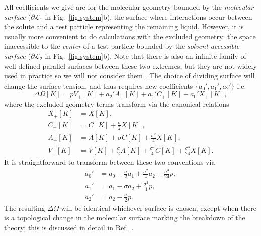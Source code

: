 \documentclass[11pt,twoside]{report}
\begin{document}
All coefficients we give are for the molecular geometry bounded by the \emph{molecular surface} ($\partial \mathcal{L}_1$ in Fig.\ \ref{fig:system}b), the surface where interactions occur between the solute and a test particle representing the remaining liquid.
However, it is usually more convenient to do calculations with the excluded geometry: the space inaccessible to the \emph{center} of a test particle bounded by the \emph{solvent accessible surface} ($\partial \mathcal{L}_2$ in Fig.\ \ref{fig:system}b).
Note that there is also an infinite family of well-defined parallel surfaces between these two extremes, but they are not widely used in practice so we will not consider them \cite{OettelEL2009}.
The choice of dividing surface will change the surface tension, and thus requires new coefficients $\{a_0', a_1', a_2'\}$ i.e.\
\begin{equation}
  \Delta\Omega[K]
  =
  p V_+[K]
  + a_2' A_+[K]
  + a_1' C_+[K]
  + a_0' X_+[K],
\end{equation}
where the excluded geometry terms transform via the canonical relations \cite{Hansen-GoosJPCM2006,OettelEL2009,Santalo2004,Klain1997}
\begin{subequations}\label{eq:exclusion-transform-volumes}
  \begin{align}
    X_+[K]
    &=
    X[K],
    \\
    C_+[K]
    &=
    C[K] + \frac{\sigma}{2} X[K],
    \\
    A_+[K]
    &=
    A[K] + \sigma C[K] + \frac{\sigma^2}{4} X[K],
    \\
    V_+[K]
    &=
    V[K]
    + \frac{\sigma}{2} A[K]
    + \frac{\sigma^2}{4} C[K]
    + \frac{\sigma^3}{24} X[K].
  \end{align}
\end{subequations}
It is straightforward to transform between these two conventions via \cite{Hansen-GoosJPCM2006,OettelEL2009}
\begin{subequations}\label{eq:exclusion-transform}
  \begin{align}
    a_0'
    &=
    a_0
    - \frac{\sigma}{2} a_1
    + \frac{\sigma^2}{4} a_2
    - \frac{\sigma^3}{24} p,
    \\
    a_1'
    &=
    a_1
    - \sigma a_2
    + \frac{\sigma^2}{4} p,
    \\
    a_2'
    &=
    a_2 - \frac{\sigma}{2} p.
  \end{align}
\end{subequations}
The resulting $\Delta \Omega$ will be identical whichever surface is chosen, except when there is a topological change in the molecular surface marking the breakdown of the theory; this is discussed in detail in Ref.\ \cite{OettelEL2009}.
\end{document}
